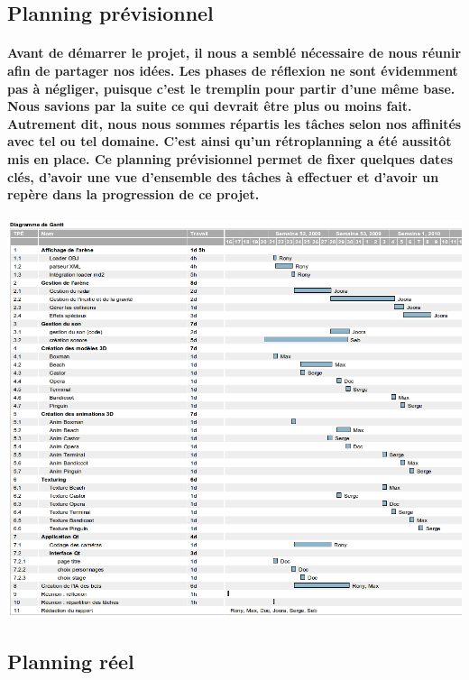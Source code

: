 \subsection{Planning prévisionnel}
\vspace{0.5cm}

\paragraph{Avant de démarrer le projet, il nous a semblé nécessaire de nous réunir afin de partager nos idées. Les phases de réflexion ne sont évidemment pas à négliger, puisque c'est le tremplin pour partir d'une m\^eme base. Nous savions par la suite ce qui devrait \^etre plus ou moins fait. Autrement dit, nous nous sommes répartis les t\^aches selon nos affinités avec tel ou tel domaine. C'est ainsi qu'un rétroplanning a été aussit\^ot mis en place. Ce planning prévisionnel permet de fixer quelques dates clés, d'avoir une vue d'ensemble des t\^aches à effectuer et d'avoir un repère dans la progression de ce projet.}
\vspace{0.5cm}
\hspace{-2cm}
\includegraphics[scale=0.5]{visuel/retroplanning.png}
\hspace{0cm}

\subsection{Planning réel}
\vspace{1cm}

